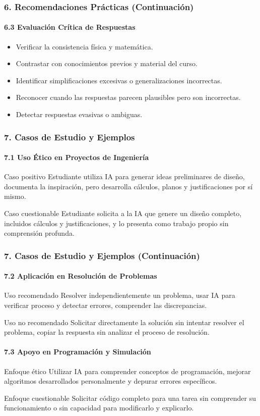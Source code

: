 \documentclass{beamer}
\begin{document}
	\begin{frame}
		\frametitle{6. Recomendaciones Prácticas (Continuación)}
		\framesubtitle{6.3 Evaluación Crítica de Respuestas}
		\begin{itemize}
			\item Verificar la consistencia física y matemática.
			\item Contrastar con conocimientos previos y material del curso.
			\item Identificar simplificaciones excesivas o generalizaciones incorrectas.
			\item Reconocer cuando las respuestas parecen plausibles pero son incorrectas.
			\item Detectar respuestas evasivas o ambiguas.
		\end{itemize}
	\end{frame}
	
	\begin{frame}
		\frametitle{7. Casos de Estudio y Ejemplos}
		\framesubtitle{7.1 Uso Ético en Proyectos de Ingeniería}
		\begin{block}{Caso positivo}
			Estudiante utiliza IA para generar ideas preliminares de diseño, documenta la inspiración, pero desarrolla cálculos, planos y justificaciones por sí mismo.
		\end{block}
		\begin{alertblock}{Caso cuestionable}
			Estudiante solicita a la IA que genere un diseño completo, incluidos cálculos y justificaciones, y lo presenta como trabajo propio sin comprensión profunda.
		\end{alertblock}
	\end{frame}
	
	\begin{frame}
		\frametitle{7. Casos de Estudio y Ejemplos (Continuación)}
		\framesubtitle{7.2 Aplicación en Resolución de Problemas}
		\begin{block}{Uso recomendado}
			Resolver independientemente un problema, usar IA para verificar proceso y detectar errores, comprender las discrepancias.
		\end{block}
		\begin{alertblock}{Uso no recomendado}
			Solicitar directamente la solución sin intentar resolver el problema, copiar la respuesta sin analizar el proceso de resolución.
		\end{alertblock}
		\pause
		\framesubtitle{7.3 Apoyo en Programación y Simulación}
		\begin{block}{Enfoque ético}
			Utilizar IA para comprender conceptos de programación, mejorar algoritmos desarrollados personalmente y depurar errores específicos.
		\end{block}
		\begin{alertblock}{Enfoque cuestionable}
			Solicitar código completo para una tarea sin comprender su funcionamiento o sin capacidad para modificarlo y explicarlo.
		\end{alertblock}
	\end{frame}
	
\end{document}
